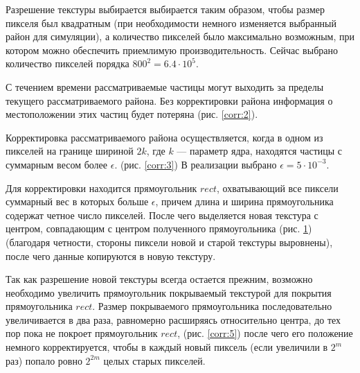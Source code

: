 Разрешение текстуры выбирается выбирается таким образом, чтобы размер пикселя был квадратным
(при необходимости немного изменяется выбранный район для симуляции), а количество пикселей
было максимально возможным, при котором можно обеспечить приемлимую производительность.
Сейчас выбрано количество пикселей порядка $800^2 = 6.4 \cdot 10^5$.

С течением времени рассматриваемые частицы могут выходить за пределы текущего рассматриваемого
района. Без корректировки района информация о местоположении этих частиц будет потеряна
(рис. \ref{corr:2}).

\begin{figure}[ht]
  \centering
\begin{minipage}[t]{.48\textwidth}
  \centering
  \label{corr:3}
\end{minipage}
\begin{minipage}[t]{.48\textwidth}
  \centering
  \label{corr:4}
\end{minipage}
\end{figure}

Корректировка рассматриваемого района осуществляется, когда в одном из пикселей на границе
шириной $2k$, где $k$ --- параметр ядра, находятся частицы с суммарным весом более $\epsilon$.
(рис. \ref{corr:3}) В реализации выбрано $\epsilon = 5 \cdot 10^{-3}$.

Для корректировки находится прямоугольник $rect$, охватывающий все пиксели суммарный вес в которых
больше $\epsilon$, причем длина и ширина прямоугольника содержат четное число пикселей.
После чего выделяется новая текстура с центром, совпадающим с центром полученного прямоугольника
(рис. \ref{corr:4}) (благодаря четности, стороны пиксели новой и старой текстуры выровнены), 
после чего данные копируются в новую текстуру.

Так как разрешение новой текстуры всегда остается прежним, возможно необходимо увеличить
прямоугольник покрываемый текстурой для покрытия прямоугольника $rect$. Размер покрываемого
прямоугольника последовательно увеличивается в два раза, равномерно расширяясь относительно центра,
до тех пор пока не покроет прямоугольник $rect$, (рис. \ref{corr:5}) после чего его положение
немного корректируется, чтобы в каждый новый пиксель (если увеличили в $2^m$ раз) попало ровно
$2^{2m}$ целых старых пикселей.

